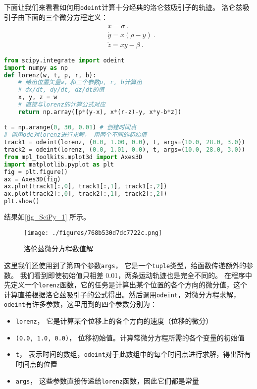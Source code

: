 下面让我们来看看如何用\verb|odeint|计算十分经典的洛仑兹吸引子的轨迹。 洛仑兹吸引子由下面的三个微分方程定义：
\begin{align}
&\dot{x}=\sigma~.\\
&\dot{y}=x(\rho-y)~.\\
&\dot{z}=xy-\beta~.
\end{align}

\begin{lstlisting}[language=python]
from scipy.integrate import odeint
import numpy as np
def lorenz(w, t, p, r, b):
    # 给出位置矢量w，和三个参数p, r, b计算出
    # dx/dt, dy/dt, dz/dt的值
    x, y, z = w
    # 直接与lorenz的计算公式对应
    return np.array([p*(y-x), x*(r-z)-y, x*y-b*z])

t = np.arange(0, 30, 0.01) # 创建时间点
# 调用ode对lorenz进行求解， 用两个不同的初始值
track1 = odeint(lorenz, (0.0, 1.00, 0.0), t, args=(10.0, 28.0, 3.0))
track2 = odeint(lorenz, (0.0, 1.01, 0.0), t, args=(10.0, 28.0, 3.0))
from mpl_toolkits.mplot3d import Axes3D
import matplotlib.pyplot as plt
fig = plt.figure()
ax = Axes3D(fig)
ax.plot(track1[:,0], track1[:,1], track1[:,2])
ax.plot(track2[:,0], track2[:,1], track2[:,2])
plt.show()
\end{lstlisting}
结果如\autoref{fig_SciPy_1} 所示。
\begin{figure}[ht]
\centering
\texttt{[image: ./figures/768b530d7dc7722c.png]}
\caption{洛伦兹微分方程数值解} \label{fig_SciPy_1}
\end{figure}
这里我们还使用到了第四个参数\verb|args|， 它是一个\verb|tuple|类型，给函数传递额外的参数。 我们看到即使初始值只相差 0.01，两条运动轨迹也是完全不同的。
在程序中先定义一个\verb|lorenz|函数，它的任务是计算出某个位置的各个方向的微分值，这个计算直接根据洛仑兹吸引子的公式得出。然后调用\verb|odeint|，对微分方程求解，\verb|odeint|有许多参数，这里用到的四个参数分别为：
\begin{itemize}
\item \verb|lorenz|， 它是计算某个位移上的各个方向的速度（位移的微分）
\item \verb|(0.0, 1.0, 0.0)|， 位移初始值。计算常微分方程所需的各个变量的初始值
\item \verb|t|， 表示时间的数组，\verb|odeint|对于此数组中的每个时间点进行求解，得出所有时间点的位置
\item \verb|args|， 这些参数直接传递给\verb|lorenz|函数，因此它们都是常量
\end{itemize}
